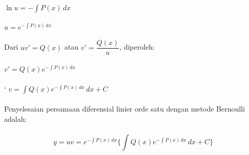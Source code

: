 \begin{enumerate}[1.]
	\begin{math} \ln u =  -\int P(x) \, dx \end{math} \\ \\
	\begin{math} u = e^{- \int P(x) \, dx} \end{math} \\ \\
	Dari \begin{math} uv' = Q(x) \end{math} atau \begin{math} v' = \dfrac{Q(x)}{u} \end{math}, diperoleh: \\ \\
	\begin{math} v' = Q(x)e^{- \int P(x) \, dx} \end{math} \\ \\
`	\begin{math} v = \int Q(x)e^{- \int P(x) \, dx} \, dx + C \end{math} \\ \\
	Penyelesaian persamaan diferensial linier orde satu dengan metode Bernoulli adalah: \\ \\
	\begin{equation} y = uv =  e^{- \int P(x) \, dx} \bigg\{ \int Q(x)e^{- \int P(x) \, dx} \, dx + C \bigg\} \end{equation}
	

\end{enumerate}
